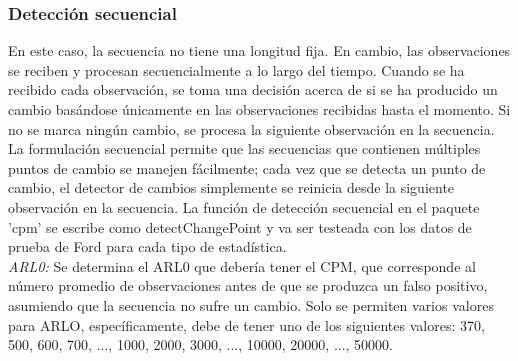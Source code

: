 \documentclass[runningheads,a4paper,12pt]{report}
\begin{document}
\subsubsection{Detección secuencial}
En este caso, la secuencia no tiene una longitud fija. En cambio, las observaciones se reciben y procesan secuencialmente a lo largo del tiempo. Cuando se ha recibido cada observación, se toma una decisión acerca de si se ha producido un cambio basándose únicamente en las observaciones recibidas hasta el momento. Si no se marca ningún cambio, se procesa la siguiente observación en la secuencia. La formulación secuencial permite que las secuencias que contienen múltiples puntos de cambio se manejen fácilmente; cada vez que se detecta un punto de cambio, el detector de cambios simplemente se reinicia desde la siguiente observación en la secuencia. La función de detección secuencial en el paquete 'cpm' se escribe como detectChangePoint y va ser testeada con los datos de prueba de Ford para cada tipo de estadística.\\

\textit{ARL0:} Se determina el ARL0 que debería tener el CPM, que corresponde al número promedio de observaciones antes de que se produzca un falso positivo, asumiendo que la secuencia no sufre un cambio. Solo se permiten varios valores para ARLO, específicamente, debe de tener uno de los siguientes valores: 370, 500, 600, 700, ..., 1000, 2000, 3000, ..., 10000, 20000, ..., 50000.\\
\end{document}
